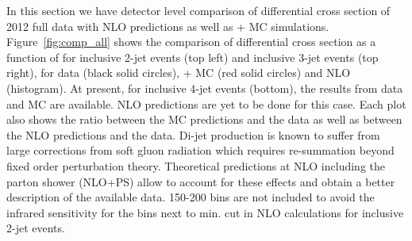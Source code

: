 In this section we have detector level comparison of differential cross section of 2012 full data with NLO predictions as well as
\MadGraphF + \PYTHIAS MC simulations. Figure~\ref{fig:comp_all} shows the comparison of differential cross section as a function of \httwo 
for inclusive 2-jet events (top left) and inclusive 3-jet events (top right), for data (black solid circles), \MadGraphF + \PYTHIAS 
MC (red solid circles) and NLO (histogram). At present, for inclusive 4-jet events (bottom), the results from data and MC are available. 
NLO predictions are yet to be done for this case. Each plot also shows the ratio between the MC predictions 
and the data as well as between the NLO predictions and the data. Di-jet production is 
known to suffer from large corrections from soft gluon radiation which requires re-summation beyond fixed order perturbation theory. 
Theoretical predictions at NLO including the parton shower (NLO+PS) allow to account for these effects and obtain a better description of 
the available data. 150-200 bins are not included to avoid the infrared sensitivity for the bins next to min. \pt cut in NLO calculations 
for inclusive 2-jet events.

